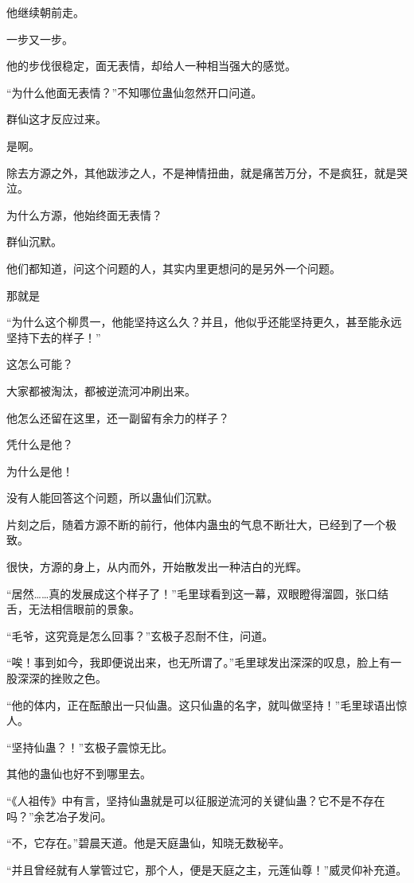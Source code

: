 \begin{this_body}
他继续朝前走。

一步又一步。

他的步伐很稳定，面无表情，却给人一种相当强大的感觉。

“为什么他面无表情？”不知哪位蛊仙忽然开口问道。

群仙这才反应过来。

是啊。

除去方源之外，其他跋涉之人，不是神情扭曲，就是痛苦万分，不是疯狂，就是哭泣。

为什么方源，他始终面无表情？

群仙沉默。

他们都知道，问这个问题的人，其实内里更想问的是另外一个问题。

那就是

“为什么这个柳贯一，他能坚持这么久？并且，他似乎还能坚持更久，甚至能永远坚持下去的样子！”

这怎么可能？

大家都被淘汰，都被逆流河冲刷出来。

他怎么还留在这里，还一副留有余力的样子？

凭什么是他？

为什么是他！

没有人能回答这个问题，所以蛊仙们沉默。

片刻之后，随着方源不断的前行，他体内蛊虫的气息不断壮大，已经到了一个极致。

很快，方源的身上，从内而外，开始散发出一种洁白的光辉。

“居然……真的发展成这个样子了！”毛里球看到这一幕，双眼瞪得溜圆，张口结舌，无法相信眼前的景象。

“毛爷，这究竟是怎么回事？”玄极子忍耐不住，问道。

“唉！事到如今，我即便说出来，也无所谓了。”毛里球发出深深的叹息，脸上有一股深深的挫败之色。

“他的体内，正在酝酿出一只仙蛊。这只仙蛊的名字，就叫做坚持！”毛里球语出惊人。

“坚持仙蛊？！”玄极子震惊无比。

其他的蛊仙也好不到哪里去。

“《人祖传》中有言，坚持仙蛊就是可以征服逆流河的关键仙蛊？它不是不存在吗？”余艺冶子发问。

“不，它存在。”碧晨天道。他是天庭蛊仙，知晓无数秘辛。

“并且曾经就有人掌管过它，那个人，便是天庭之主，元莲仙尊！”威灵仰补充道。


\end{this_body}
